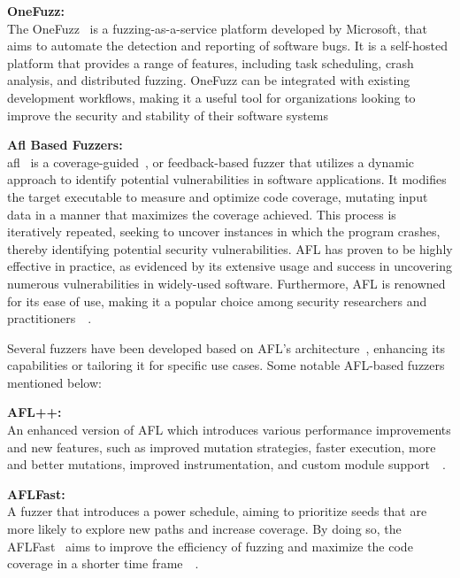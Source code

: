 \textbf{OneFuzz:~\cite{GitHubmi60:online}}\\

The OneFuzz~\cite{GitHubmi60:online} is a fuzzing-as-a-service platform developed by Microsoft, that aims to
automate the detection and reporting of software bugs. It is a self-hosted
platform that provides a range of features, including task scheduling,
crash analysis, and distributed fuzzing. OneFuzz can be integrated with
existing development workflows, making it a useful tool for organizations
looking to improve the security and stability of their software systems

\textbf{Afl Based Fuzzers:}\\

\acrlong{afl}~\cite{american20:online} is a coverage-guided~\cite{lyu2022ems}, or feedback-based fuzzer that utilizes a
dynamic approach to identify potential vulnerabilities in software applications.
It modifies the target executable to measure and optimize code coverage,
mutating input data in a manner that maximizes the coverage achieved.
This process is iteratively repeated, seeking to uncover instances in
which the program crashes, thereby identifying potential security vulnerabilities.
AFL has proven to be highly effective in practice, as evidenced by its extensive
usage and success in uncovering numerous vulnerabilities in widely-used software.
Furthermore, AFL is renowned for its ease of use, making it a popular choice
among security researchers and practitioners~\cite{american20:online}~\cite{fuzzinga40:online}.

Several fuzzers have been developed based on AFL's architecture~\cite{american20:online}, enhancing its
capabilities or tailoring it for specific use cases. Some notable AFL-based
fuzzers mentioned below:

\textbf{AFL++:~\cite{257204}~\cite{GitHubAF78:online}} \\
An enhanced version of AFL which
introduces various performance improvements and new features, such as improved mutation strategies,
faster execution, more and better mutations, improved instrumentation, and custom module
support~\cite{257204}~\cite{GitHubAF78:online}.

\textbf{AFLFast:~\cite{GitHubmb97:online}} \\
A fuzzer that introduces a power schedule, aiming to prioritize
seeds that are more likely to explore new paths and increase coverage.
By doing so, the AFLFast~\cite{GitHubmb97:online} aims to improve the efficiency of fuzzing and maximize
the code coverage in a shorter time frame~\cite{bohme2016coverage}~\cite{GitHubmb97:online}.

